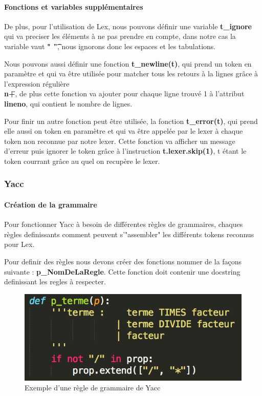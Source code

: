 \documentclass[a4paper,12pt]{article}
\begin{document}
			\paragraph{Fonctions et variables supplémentaires}

				De plus, pour l'utilisation de Lex, nous pouvons définir une variable \textbf{t\_ignore} qui va preciser les éléments à ne pas prendre en compte, dans notre cas la variable vaut \textbf{" \t"}, nous ignorons donc les espaces et les tabulations.

				Nous pouvons aussi définir une fonction \textbf{t\_newline(t)}, qui prend un token en paramètre et qui va être utilisée pour matcher tous les retours à la lignes grâce à l'expression régulière \textbf{\"\\n+\"}, de plus cette fonction va ajouter pour chaque ligne trouvé 1 à l'attribut \textbf{lineno}, qui contient le nombre de lignes.

				Pour finir un autre fonction peut être utilisée, la fonction \textbf{t\_error(t)}, qui prend elle aussi on token en paramètre et qui va être appelée par le lexer à chaque token non reconnue par notre lexer. Cette fonction va afficher un message d'erreur puis ignorer le token grâce à l'instruction \textbf{t.lexer.skip(1)}, t étant le token courrant grâce au quel on recupère le lexer. 

		\subsubsection{Yacc}

			\paragraph{Création de la grammaire}

				Pour fonctionner Yacc à besoin de différentes règles de grammaires, chaques règles definissants comment peuvent s'"assembler" les différents tokens reconnus pour Lex.

				Pour definir des règles nous devons créer des fonctions nommer de la façons suivante : \textbf{p\_NomDeLaRegle}. Cette fonction doit contenir une docstring definissant les regles à respecter.

				\begin{figure}[h!]
					\begin{center}
						\includegraphics[scale=1]{images/exp_grammaire_yacc}
						\caption{Exemple d'une règle de grammaire de Yacc}
					\end{center}
				\end{figure}
\end{document}

